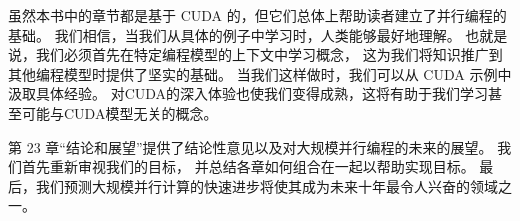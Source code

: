 虽然本书中的章节都是基于 CUDA 的，但它们总体上帮助读者建立了并行编程的基础。 
我们相信，当我们从具体的例子中学习时，人类能够最好地理解。 也就是说，我们必须首先在特定编程模型的上下文中学习概念，
这为我们将知识推广到其他编程模型时提供了坚实的基础。 当我们这样做时，我们可以从 CUDA 示例中汲取具体经验。 
对CUDA的深入体验也使我们变得成熟，这将有助于我们学习甚至可能与CUDA模型无关的概念。

第 23 章“结论和展望”提供了结论性意见以及对大规模并行编程的未来的展望。 我们首先重新审视我们的目标，
并总结各章如何组合在一起以帮助实现目标。 最后，我们预测大规模并行计算的快速进步将使其成为未来十年最令人兴奋的领域之一。
